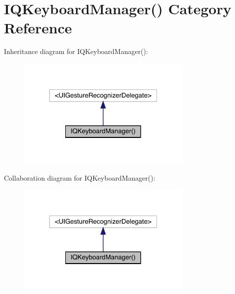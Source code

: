 \hypertarget{category_i_q_keyboard_manager_07_08}{}\section{I\+Q\+Keyboard\+Manager() Category Reference}
\label{category_i_q_keyboard_manager_07_08}


Inheritance diagram for I\+Q\+Keyboard\+Manager()\+:\nopagebreak
\begin{figure}[H]
\begin{center}
\leavevmode
\includegraphics[width=244pt]{category_i_q_keyboard_manager_07_08__inherit__graph}
\end{center}
\end{figure}


Collaboration diagram for I\+Q\+Keyboard\+Manager()\+:\nopagebreak
\begin{figure}[H]
\begin{center}
\leavevmode
\includegraphics[width=244pt]{category_i_q_keyboard_manager_07_08__coll__graph}
\end{center}
\end{figure}
